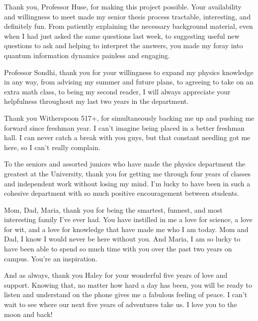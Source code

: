 Thank you, Professor Huse, for making this project possible. Your availability and willingness to meet made my senior thesis process tractable, interesting, and definitely fun. From patiently explaining the necessary background material, even when I had just asked the same questions last week, to suggesting useful new questions to ask and helping to interpret the answers, you made my foray into quantum information dynamics painless and engaging. 

Professor Sondhi, thank you for your willingness to expand my physics knowledge in any way, from advising my summer and future plans, to agreeing to take on an extra math class, to being my second reader, I will always appreciate your helpfulness throughout my last two years in the department. 

Thank you Witherspoon 517+, for simultaneously backing me up and pushing me forward  since freshman year. I can't imagine being placed in a better freshman hall. I can never catch a break with you guys, but that constant needling got me here, so I can't really complain.

To the seniors and assorted juniors who have made the physics department the greatest at the University, thank you for getting me through four years of classes and independent work without losing my mind. I'm lucky to have been in such a cohesive department with so much positive encouragement between students.

Mom, Dad, Maria, thank you for being the smartest, funnest, and most interesting family I've ever had. You have instilled in me a love for science, a love for wit, and a love for knowledge that have made me who I am today. Mom and Dad, I know I would never be here without you. And Maria, I am so lucky to have been able to spend so much time with you over the past two years on campus. You're an inspiration.

And as always, thank you Haley for your wonderful five years of love and support. Knowing that, no matter how hard a day has been, you will be ready to listen and understand on the phone gives me a fabulous feeling of peace. I can't wait to see where our next five years of adventures take us. I love you to the moon and back!

\newpage

\tableofcontents